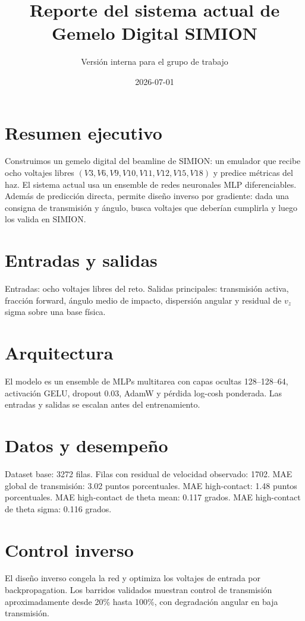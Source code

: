 \documentclass[11pt]{article}
\title{Reporte del sistema actual de Gemelo Digital SIMION}
\author{Versión interna para el grupo de trabajo}
\date{2026-07-01}
\begin{document}
\maketitle

\section{Resumen ejecutivo}
Construimos un gemelo digital del beamline de SIMION: un emulador que recibe ocho voltajes libres
$(V3,V6,V9,V10,V11,V12,V15,V18)$ y predice métricas del haz. El sistema actual usa un ensemble de
redes neuronales MLP diferenciables. Además de predicción directa, permite diseño inverso por gradiente:
dada una consigna de transmisión y ángulo, busca voltajes que deberían cumplirla y luego los valida en SIMION.

\section{Entradas y salidas}
Entradas: ocho voltajes libres del reto. Salidas principales: transmisión activa, fracción forward,
ángulo medio de impacto, dispersión angular y residual de $v_z$ sigma sobre una base física.

\section{Arquitectura}
El modelo es un ensemble de MLPs multitarea con capas ocultas 128--128--64, activación GELU,
dropout 0.03, AdamW y pérdida log-cosh ponderada. Las entradas y salidas se escalan antes del entrenamiento.

\section{Datos y desempeño}
Dataset base: 3272 filas. Filas con residual de velocidad observado: 1702.
MAE global de transmisión: 3.02 puntos porcentuales. MAE high-contact:
1.48 puntos porcentuales. MAE high-contact de theta mean:
0.117 grados. MAE high-contact de theta sigma: 0.116 grados.

\section{Control inverso}
El diseño inverso congela la red y optimiza los voltajes de entrada por backpropagation. Los barridos
validados muestran control de transmisión aproximadamente desde 20\% hasta 100\%, con degradación angular
en baja transmisión.
\end{document}
